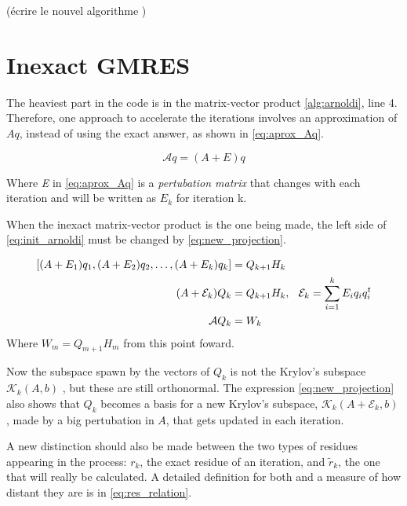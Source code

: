     (écrire le nouvel algorithme )

    \section{Inexact GMRES}

    The heaviest part in the code is in the matrix-vector product \ref{alg:arnoldi}, line 4. Therefore, one approach to accelerate the iterations involves an approximation of $Aq $, instead of using the exact answer, as shown in \ref{eq:aprox_Aq}.

    \begin{equation}\label{eq:aprox_Aq}
        \mathcal{A}q = (A + E)q
    \end{equation}
    
    Where \textit{E} in \ref{eq:aprox_Aq} is a \textit{pertubation matrix} that changes with each iteration and will be written as $E_{k}$ for iteration k.

    When the inexact matrix-vector product is the one being made, the left side of \ref{eq:init_arnoldi} must be changed by \ref{eq:new_projection}.


    \begin{align} \label{eq:new_projection}
    \begin{split}
        [(A + E_{1})q_{1}, (A + E_{2})q_{2},\dots, (A + E_{k})q_{k}] &= Q_{k+1}H_{k}\\ 
        (A + \mathcal{E}_{k})Q_{k} &= Q_{k+1}H_{k}, \hspace{0.1in} \mathcal{E}_{k} = \sum_{i=1}^{k}E_{i}q_{i}q_{i}^{t}\\
        \mathcal{A}Q_{k} &= W_{k}
    \end{split}
    \end{align}
    Where $W_{m} = Q_{m+1}H_{m}$ from this point foward.

    Now the subspace spawn by the vectors of $Q_{k}$ is not the Krylov's subspace $\mathcal{K}_{k}(A,b)$ , but these are still orthonormal. The expression \ref{eq:new_projection} also shows that $Q_{k}$ becomes a basis for a new Krylov's subspace, $\mathcal{K}_{k}(A+\mathcal{E}_{k},b)$, made by a big pertubation in $A$, that gets updated in each iteration.
    
    A new distinction should also be made between the two types of residues appearing in the process: $r_{k}$, the exact residue of an iteration, and $\tilde{r}_{k}$, the one that will really be calculated. A detailed definition for both and a measure of how distant they are is in \ref{eq:res_relation}.

